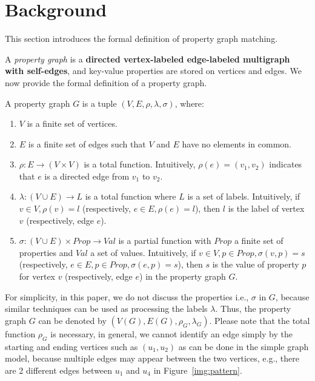 \section{Background}\label{sec:background}
This section introduces the formal definition of property graph matching.

A \emph{property graph} is a \textbf{directed vertex-labeled edge-labeled multigraph with self-edges},
and key-value properties are stored on vertices and edges.
We now provide the formal definition of a property graph.
\begin{definition}
  A property graph $G$ is a tuple $(V, E, \rho, \lambda, \sigma)$, where:
  \begin{enumerate}[noitemsep,label={(\arabic*)}]
  \item $V$ is a finite set of vertices.
  \item $E$ is a finite set of edges such that $V$ and $E$ have no elements in common.
  \item $\rho: E \rightarrow (V \times V)$ is a total function.
    Intuitively, $\rho(e) = (v_1, v_2)$ indicates that $e$ is a directed edge from $v_1$ to $v_2$.
  \item $\lambda :(V \cup E) \rightarrow L$ is a total function where $L$ is a set of labels.
    Intuitively, if $v \in V, \rho(v) = l$ (respectively, $e \in E, \rho(e) = l$),
    then $l$ is the label of vertex $v$ (respectively, edge $e$).
  \item $\sigma: (V \cup E) \times Prop \rightarrow Val$ is a partial function with $Prop$ a finite set of properties and $Val$ a set of values.
    Intuitively, if $v \in V, p \in Prop, \sigma(v, p) = s$ (respectively, $e \in E, p \in Prop, \sigma(e, p) = s$),
    then $s$ is the value of property $p$ for vertex $v$ (respectively, edge $e$) in the property graph $G$.
  \end{enumerate}
\end{definition}
For simplicity, in this paper, we do not discuss the properties i.e., $\sigma$ in $G$,
because similar techniques can be used as processing the labels $\lambda$.
Thus, the property graph $G$ can be denoted by $(V(G), E(G), \rho_G, \lambda_G)$.
Please note that the total function $\rho_G$ is necessary, in general,
we cannot identify an edge simply by the starting and ending vertices such as $(u_1, u_2)$ as can be done in the simple graph model,
because multiple edges may appear between the two vertices,
e.g., there are 2 different edges between $u_1$ and $u_4$ in Figure~\ref{img:pattern}.
